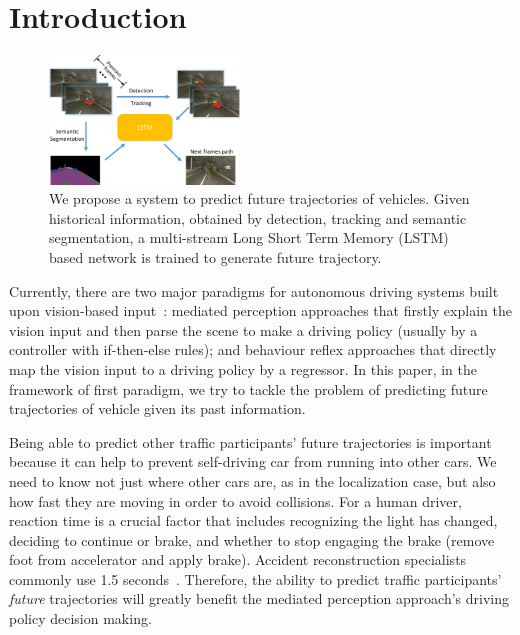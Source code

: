 \documentclass[10pt,twocolumn,letterpaper]{article}
\begin{document}
\section{Introduction}
\begin{figure}[t]
        \centering
        \includegraphics[width=0.45\textwidth]{figures/pull_figure.pdf}
        \caption{ \small{
        We propose a system to predict future trajectories of vehicles. Given historical information, obtained by detection, tracking and semantic segmentation, a multi-stream Long Short Term Memory (LSTM)  based network is trained to generate future trajectory.}}
        \label{fig:pull_figure}
\end{figure}

Currently, there are two major paradigms for autonomous driving systems built upon vision-based input~\cite{chen2015deepdriving}: mediated perception approaches that firstly explain the vision input and then parse the scene to make a driving policy (usually by a controller with if-then-else rules); and behaviour reflex approaches that directly map the vision input to a driving policy by a regressor.
In this paper, in the framework of first paradigm, we try to tackle the problem of predicting future trajectories of vehicle given its past information.


 Being able to predict other traffic participants' future trajectories is important because it can help to prevent self-driving car from running into other cars. We need to know not just where other cars are, as in the localization case, but also how fast they are moving in order to avoid collisions.
For a human driver, reaction time is a crucial factor that includes recognizing the light has changed, deciding to continue or brake, and whether to stop engaging the brake (remove foot from accelerator and apply brake). Accident reconstruction specialists commonly use 1.5 seconds~\cite{mcgehee2000driver}.
Therefore, the ability to predict traffic participants' \emph{future} trajectories will greatly benefit the mediated perception approach's driving policy decision making.
\end{document}
